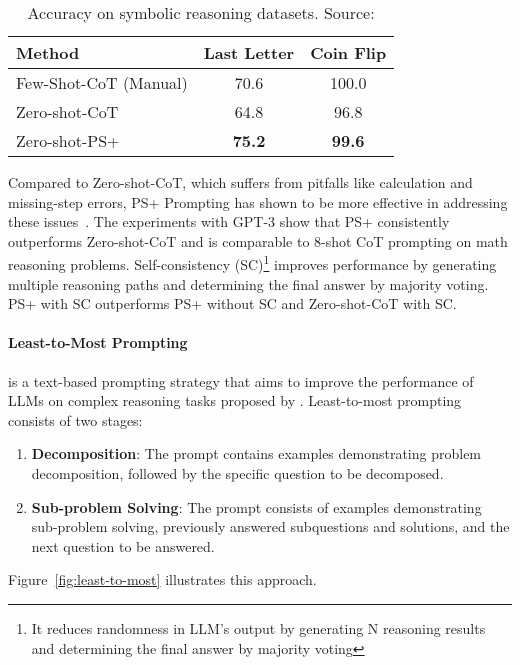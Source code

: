 \begin{table}[h!]
	\centering
	\begin{tabularx}{\textwidth}{Xcc}
		\hline
		\textbf{Method}       & \textbf{Last Letter} & \textbf{Coin Flip} \\ \hline
		Few-Shot-CoT (Manual) & 70.6                 & 100.0              \\
		Zero-shot-CoT         & 64.8                 & 96.8               \\
		Zero-shot-PS+         & \textbf{75.2}        & \textbf{99.6}      \\ \hline
	\end{tabularx}
	\caption{Accuracy on symbolic reasoning datasets. Source: \textcite{wang2023plan}}
	\label{tab:symbolic-reasoning}
\end{table}

Compared to Zero-shot-CoT, which suffers from pitfalls like calculation and missing-step errors, PS+ Prompting has shown to be more effective in addressing these issues~\cite{wang2023plan}.
The experiments with GPT-3 show that PS+ consistently outperforms Zero-shot-CoT and is comparable to 8-shot CoT prompting on math reasoning problems.
Self-consistency (SC)\footnote{It reduces randomness in LLM’s output by generating N reasoning results and determining the final answer by majority voting}\cite{wang2022self} improves performance by generating multiple reasoning paths and determining the final answer by majority voting.
PS+ with SC outperforms PS+ without SC and Zero-shot-CoT with SC\@.

\paragraph{Least-to-Most Prompting}
\label{par:least-to-most}

is a text-based prompting strategy that aims to improve the performance of LLMs on complex reasoning tasks proposed by \textcite{zhou2022least}.
Least-to-most prompting consists of two stages:
\begin{enumerate}
	\item \textbf{Decomposition}: The prompt contains examples demonstrating problem decomposition, followed by the specific question to be decomposed.
	\item \textbf{Sub-problem Solving}: The prompt consists of examples demonstrating sub-problem solving, previously answered subquestions and solutions, and the next question to be answered.
\end{enumerate}
Figure~\ref{fig:least-to-most} illustrates this approach.

